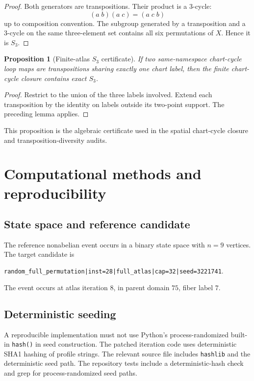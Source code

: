 \documentclass[11pt]{article}
\newtheorem{proposition}{Proposition}
\begin{document}
\begin{proof}
Both generators are transpositions.  Their product is a 3-cycle:
\[
(a\;b)(a\;c)=(a\;c\;b)
\]
up to composition convention.  The subgroup generated by a transposition and a 3-cycle on the same three-element set contains all six permutations of $X$.  Hence it is $S_3$.
\end{proof}

\begin{proposition}[Finite-atlas $S_3$ certificate]
If two same-namespace chart-cycle loop maps are transpositions sharing exactly one chart label, then the finite chart-cycle closure contains exact $S_3$.
\end{proposition}

\begin{proof}
Restrict to the union of the three labels involved.  Extend each transposition by the identity on labels outside its two-point support.  The preceding lemma applies.
\end{proof}

This proposition is the algebraic certificate used in the spatial chart-cycle closure and transposition-diversity audits.

\section{Computational methods and reproducibility}

\subsection{State space and reference candidate}

The reference nonabelian event occurs in a binary state space with $n=9$ vertices.  The target candidate is
\begin{center}
\texttt{random\_full\_permutation|inst=28|full\_atlas|cap=32|seed=3221741}.
\end{center}
The event occurs at atlas iteration $8$, in parent domain $75$, fiber label $7$.

\subsection{Deterministic seeding}

A reproducible implementation must not use Python's process-randomized built-in \texttt{hash()} in seed construction.  The patched iteration code uses deterministic SHA1 hashing of profile strings.  The relevant source file includes \texttt{hashlib} and the deterministic seed path.  The repository tests include a deterministic-hash check and grep for process-randomized seed paths.
\end{document}
